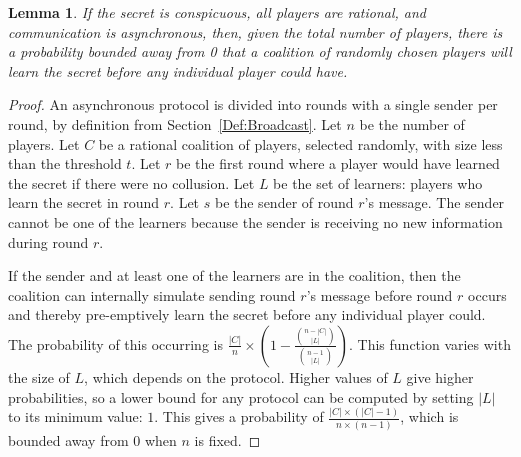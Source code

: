 \documentclass[12pt]{dalcsthesis}
\newtheorem{lemma}{Lemma}
\begin{document}
\begin{lemma}\label{Lem:Async:CoalitionsMayPreempt}If the secret is conspicuous, all players are rational, and communication is asynchronous, then, given the total number of players, there is a probability bounded away from 0 that a coalition of randomly chosen players will learn the secret before any individual player could have.\end{lemma}
\begin{proof}
An asynchronous protocol is divided into rounds with a single sender per round, by definition from Section~\ref{Def:Broadcast}. 
Let $n$ be the number of players.
Let $C$ be a rational coalition of players, selected randomly, with size less than the threshold $t$.
Let $r$ be the first round where a player would have learned the secret if there were no collusion.
Let $L$ be the set of learners: players who learn the secret in round $r$.
Let $s$ be the sender of round $r$'s message.
The sender cannot be one of the learners because the sender is receiving no new information during round $r$.

If the sender and at least one of the learners are in the coalition, then the coalition can internally simulate sending round $r$'s message before round $r$ occurs and thereby pre-emptively learn the secret before any individual player could. The probability of this occurring is $\frac{|C|}{n} \times \left(1 - \frac{\binom{n - |C|}{|L|}}{\binom{n - 1}{|L|}}\right)$. This function varies with the size of $L$, which depends on the protocol. Higher values of $L$ give higher probabilities, so a lower bound for any protocol can be computed by setting $|L|$ to its minimum value: $1$. This gives a probability of $\frac{|C| \times (|C| - 1)}{n \times (n-1)}$, which is bounded away from $0$ when $n$ is fixed.
\end{proof}
\end{document}
